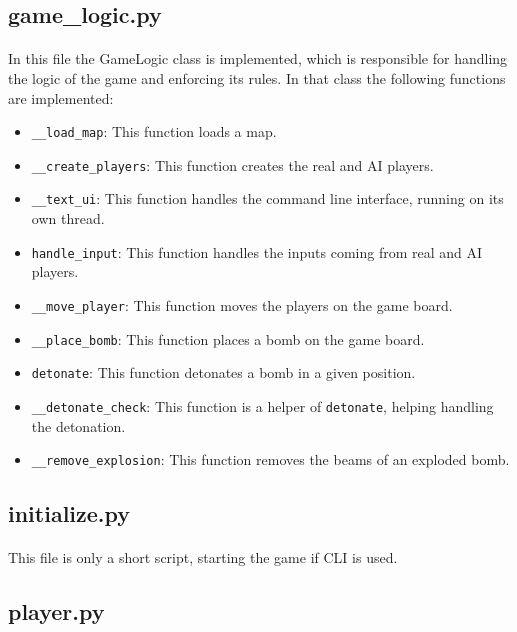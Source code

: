 \documentclass{article}
\begin{document}
    \subsection{game\_logic.py}
        \paragraph{}
        In this file the GameLogic class is implemented, which is responsible for handling the logic of the game and enforcing its rules. In that class the following functions are implemented:
        \begin{itemize}
            \item \verb|__load_map|: This function loads a map.
            \item \verb|__create_players|: This function creates the real and AI players.
            \item \verb|__text_ui|: This function handles the command line interface, running on its own thread.
            \item \verb|handle_input|: This function handles the inputs coming from real and AI players.
            \item \verb|__move_player|: This function moves the players on the game board.
            \item \verb|__place_bomb|: This function places a bomb on the game board.
            \item \verb|detonate|: This function detonates a bomb in a given position.
            \item \verb|__detonate_check|: This function is a helper of \verb|detonate|, helping handling the detonation.
            \item \verb|__remove_explosion|: This function removes the beams of an exploded bomb.
        \end{itemize}

    \subsection{initialize.py}
        \paragraph{}
        This file is only a short script, starting the game if CLI is used.

    \subsection{player.py}
\end{document}
